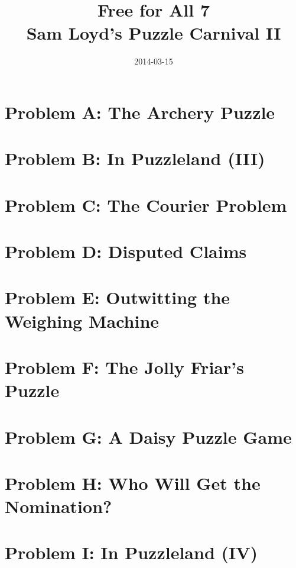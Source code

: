 \documentclass[12pt]{article}
\title{
Free for All 7\\
Sam Loyd's Puzzle Carnival II
}
\date{2014-03-15}
\begin{document}
\maketitle

\pagebreak
\section{Problem A: The Archery Puzzle}


\pagebreak
\section{Problem B: In Puzzleland (III)}


\pagebreak
\section{Problem C: The Courier Problem}


\pagebreak
\section{Problem D: Disputed Claims}


\pagebreak
\section{Problem E: Outwitting the Weighing Machine}


\pagebreak
\section{Problem F: The Jolly Friar's Puzzle}


\pagebreak
\section{Problem G: A Daisy Puzzle Game}


\pagebreak
\section{Problem H: Who Will Get the Nomination?}


\pagebreak
\section{Problem I: In Puzzleland (IV)}

\end{document}
